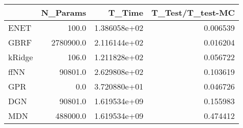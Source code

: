 \begin{tabular}{lrrr}
\toprule
{} &   N\_Params &        T\_Time &  T\_Test/T\_test-MC \\
\midrule
ENET   &      100.0 &  1.386058e+02 &          0.006539 \\
GBRF   &  2780900.0 &  2.116144e+02 &          0.016204 \\
kRidge &      106.0 &  1.211828e+02 &          0.056722 \\
ffNN   &    90801.0 &  2.629808e+02 &          0.103619 \\
GPR    &        0.0 &  3.720880e+01 &          0.046726 \\
DGN    &    90801.0 &  1.619534e+09 &          0.155983 \\
MDN    &   488000.0 &  1.619534e+09 &          0.474412 \\
\bottomrule
\end{tabular}
